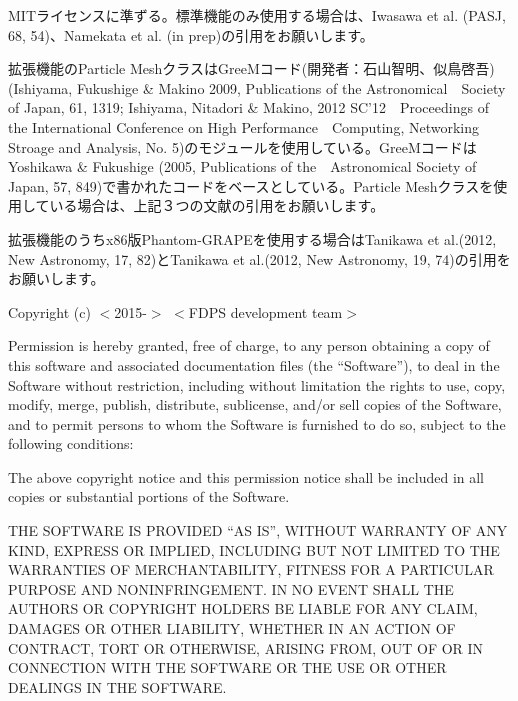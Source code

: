 MITライセンスに準ずる。標準機能のみ使用する場合は、Iwasawa et al. (PASJ, 68, 54)、Namekata et al. (in prep)の引用をお願いします。

拡張機能のParticle MeshクラスはGreeMコード(開発者：石山智明、似鳥啓吾)　(Ishiyama, Fukushige \& Makino 2009, Publications of the Astronomical　Society of Japan, 61, 1319; Ishiyama, Nitadori \& Makino, 2012 SC'12　Proceedings of the International Conference on High Performance　Computing, Networking Stroage and Analysis, No. 5)のモジュールを使用している。GreeMコードはYoshikawa \& Fukushige (2005, Publications of the　Astronomical Society of Japan, 57, 849)で書かれたコードをベースとしている。Particle Meshクラスを使用している場合は、上記３つの文献の引用をお願いします。

拡張機能のうちx86版Phantom-GRAPEを使用する場合はTanikawa et al.(2012, New Astronomy, 17, 82)とTanikawa et al.(2012, New Astronomy, 19, 74)の引用をお願いします。

\vspace{5mm}

Copyright (c) $<$2015-$>$ $<$FDPS development team$>$

\vspace{3mm}

Permission is hereby granted, free of charge, to any person obtaining
a copy of this software and associated documentation files (the
``Software''), to deal in the Software without restriction, including
without limitation the rights to use, copy, modify, merge, publish,
distribute, sublicense, and/or sell copies of the Software, and to
permit persons to whom the Software is furnished to do so, subject to
the following conditions:

\vspace{3mm}

The above copyright notice and this permission notice shall be
included in all copies or substantial portions of the Software.

\vspace{3mm}

THE SOFTWARE IS PROVIDED ``AS IS'', WITHOUT WARRANTY OF ANY KIND,
EXPRESS OR IMPLIED, INCLUDING BUT NOT LIMITED TO THE WARRANTIES OF
MERCHANTABILITY, FITNESS FOR A PARTICULAR PURPOSE AND
NONINFRINGEMENT. IN NO EVENT SHALL THE AUTHORS OR COPYRIGHT HOLDERS BE
LIABLE FOR ANY CLAIM, DAMAGES OR OTHER LIABILITY, WHETHER IN AN ACTION
OF CONTRACT, TORT OR OTHERWISE, ARISING FROM, OUT OF OR IN CONNECTION
WITH THE SOFTWARE OR THE USE OR OTHER DEALINGS IN THE SOFTWARE.
